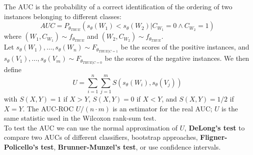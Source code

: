 The AUC is the probability of a correct identification of the ordering of two instances belonging to different classes:
\begin{equation*}
    \textit{AUC} = P_{\theta_{\textit{TRUE}}} (s_{\theta}(W_1) < s_{\theta}(W_2) | C_{W_1} = 0 \land C_{W_2} = 1)
\end{equation*}
where $(W_1, C_{W_1}) \sim f_{\theta_{\textit{TRUE}}}$ and $(W_2, C_{W_2}) \sim f_{\theta_{\textit{TRUE}}}$. \\
Let $s_{\theta}(W_1), \ldots, s_{\theta}(W_n) \sim F_{\theta_{\textit{TRUE} | C = 1}}$ be the scores of the positive instances, and $s_{\theta}(V_1), \ldots, s_{\theta}(V_m) \sim F_{\theta_{\textit{TRUE} | C = 0}}$ be the scores of the negative instances. We then define
\begin{equation*}
    U = \sum_{i=1}^n \sum_{j=1}^m S(s_{\theta}(W_i), s_{\theta}(V_j))
\end{equation*}
with $S(X,Y) = 1$ if $X > Y$, $S(X,Y) = 0$ if $X < Y$, and $S(X,Y) = 1/2$ if $X = Y$. The AUC-ROC $U / (n \cdot m)$ is an estimator for the real AUC; $U$ is the same statistic used in the Wilcoxon rank-sum test. \\
To test the AUC we can use the normal approximation of $U$, \textbf{DeLong's test} to compare two AUCs of different classifiers, bootstrap approaches, \textbf{Fligner-Policello's test}, \textbf{Brunner-Munzel's test}, or use confidence intervals. 